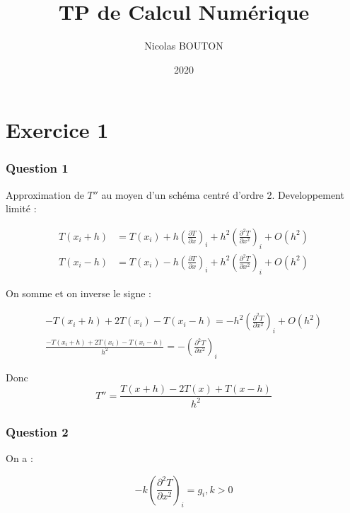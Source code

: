 \documentclass[11pt]{article}
\title{TP de Calcul Numérique}
\author{Nicolas BOUTON}
\date{2020}
\begin{document}
\maketitle

\section{Exercice 1}

\subsubsection{Question 1}

Approximation de $T''$ au moyen d'un schéma centré d'ordre 2.\newline
\vspace{5mm}
Developpement limité : 

\begin{equation*}
  \begin{split}
    T(x_i + h) & = T(x_i) + h \left(\frac{\partial T}{\partial x} \right)_i + h^2 \left(\frac{\partial^2 T}{\partial x^2} \right)_i + O(h^2) \\
    T(x_i - h) & = T(x_i) - h \left(\frac{\partial T}{\partial x} \right)_i + h^2 \left(\frac{\partial^2 T}{\partial x^2} \right)_i + O(h^2)
  \end{split}
\end{equation*}

On somme et on inverse le signe :

\begin{equation*}
  \begin{split}
    - T(x_i + h) + 2 T(x_i) - T(x_i - h) = - h^2 \left(\frac{\partial^2 T}{\partial x^2} \right)_i + O(h^2) \\
    \frac{- T(x_i + h) + 2 T(x_i) - T(x_i - h)}{h^2} = - \left(\frac{\partial^2 T}{\partial x^2} \right)_i
  \end{split}
\end{equation*}

Donc
\begin{equation*}
  T'' = \frac{T(x + h) - 2 T(x) + T(x - h)}{h^2}
\end{equation*}

\subsubsection{Question 2}

On a :

\begin{equation*}
  - k \left( \frac{\partial^2 T}{\partial x^2} \right)_i = g_i, k > 0
\end{equation*}
\end{document}
